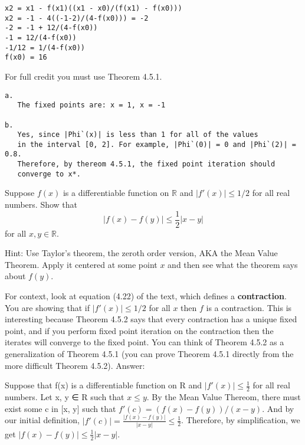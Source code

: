 \documentclass[12pt]{article}
\makeatletter
\theoremstyle{homework}
\newenvironment{exercise}[1]
{\def\@currentlabel{#1}\exercisecore}
{\endexercisecore}
\makeatother
\begin{document}
\begin{exercise}{Chapter 4: 8}
\end{exercise}
\begin{verbatim}
x2 = x1 - f(x1)((x1 - x0)/(f(x1) - f(x0)))
x2 = -1 - 4((-1-2)/(4-f(x0))) = -2
-2 = -1 + 12/(4-f(x0))
-1 = 12/(4-f(x0))
-1/12 = 1/(4-f(x0))
f(x0) = 16 
\end{verbatim}

\begin{exercise}{Chapter 4: 12}  For full credit you must
use Theorem 4.5.1.
\end{exercise}
\begin{verbatim}
a. 
   The fixed points are: x = 1, x = -1

b. 
   Yes, since |Phi`(x)| is less than 1 for all of the values 
   in the interval [0, 2]. For example, |Phi`(0)| = 0 and |Phi`(2)| = 0.8. 
   Therefore, by thereom 4.5.1, the fixed point iteration should 
   converge to x*.
\end{verbatim}

\begin{exercise}{Supplemental 1}
Suppose $f(x)$ is a differentiable function 
on $\mathbb{R}$ and $|f'(x)|\le 1/2$ for
all real numbers.  Show that
\[
|f(x)-f(y)|\le \frac{1}{2} |x-y|
\]
for all $x,y\in \mathbb{R}$.

Hint: Use Taylor's theorem, the zeroth order version, AKA the Mean Value Theorem.  Apply it centered at some point $x$ and then see what the theorem says about $f(y)$.

For context, look at equation (4.22) of the text, which defines a \textbf{contraction}.  You are showing that if $|f'(x)|\le 1/2$ for all $x$ then
$f$ is a contraction.  This is interesting because Theorem 4.5.2 says
that every contraction has a unique fixed point, and if you perform fixed
point iteration on the contraction then the iterates will converge to the fixed point.  You can think of Theorem 4.5.2 as a generalization of Theorem 4.5.1 (you can prove Theorem 4.5.1 directly from the more difficult Theorem 4.5.2).
\end{exercise}
Answer:

Suppose that f(x) is a differentiable function on R and $|f′(x)| \leq \frac{1}{2}$ for 
all real numbers. Let x, y ∈ R such that $x \leq y$. By the Mean Value Thereom, 
there must exist some c in [x, y] such that $f'(c) = (f(x)-f(y))/(x-y)$. 
And by our initial definition, $|f'(c)| = \frac{|f(x)-f(y)|}{|x-y|} \leq \frac{1}{2}$. 
Therefore, by simplification, we get $|f(x)-f(y)| \leq \frac{1}{2}|x-y|$.
\end{document}
